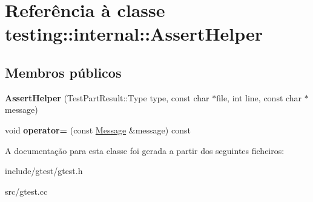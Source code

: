 \hypertarget{classtesting_1_1internal_1_1AssertHelper}{\section{Referência à classe testing\-:\-:internal\-:\-:Assert\-Helper}
\label{classtesting_1_1internal_1_1AssertHelper}
}
\subsection*{Membros públicos}
\begin{DoxyCompactItemize}
\item 
\hypertarget{classtesting_1_1internal_1_1AssertHelper_ac2c9334518fd4087189b4505567a3c90}{{\bfseries Assert\-Helper} (Test\-Part\-Result\-::\-Type type, const char $\ast$file, int line, const char $\ast$message)}\label{classtesting_1_1internal_1_1AssertHelper_ac2c9334518fd4087189b4505567a3c90}

\item 
\hypertarget{classtesting_1_1internal_1_1AssertHelper_ab721be11cb9aca8a361ca1f014ca5f80}{void {\bfseries operator=} (const \hyperlink{classtesting_1_1Message}{Message} \&message) const }\label{classtesting_1_1internal_1_1AssertHelper_ab721be11cb9aca8a361ca1f014ca5f80}

\end{DoxyCompactItemize}


A documentação para esta classe foi gerada a partir dos seguintes ficheiros\-:\begin{DoxyCompactItemize}
\item 
include/gtest/gtest.\-h\item 
src/gtest.\-cc\end{DoxyCompactItemize}
